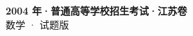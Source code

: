 \documentclass[zihao=-4, a4paper]{ctexart}
\begin{document}
\begin{center}
  {\Large\bfseries 2004 年·普通高等学校招生考试·江苏卷}\\[4pt]
  {\large 数学 · 试题版}
\end{center}
\medskip
{}

\end{document}
